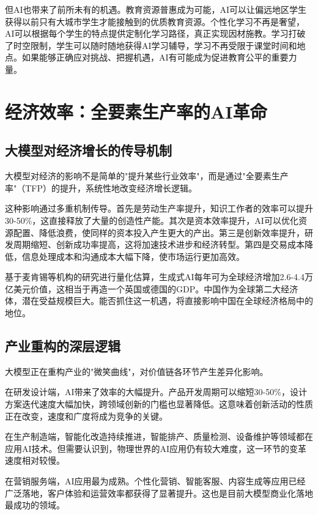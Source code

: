但AI也带来了前所未有的机遇。教育资源普惠成为可能，AI可以让偏远地区学生获得以前只有大城市学生才能接触到的优质教育资源。个性化学习不再是奢望，AI可以根据每个学生的特点提供定制化学习路径，真正实现因材施教。学习打破了时空限制，学生可以随时随地获得AI学习辅导，学习不再受限于课堂时间和地点。如果能够正确应对挑战、把握机遇，AI有可能成为促进教育公平的重要力量。

\section{经济效率：全要素生产率的AI革命}

\subsection{大模型对经济增长的传导机制}

大模型对经济的影响不是简单的"提升某些行业效率"，而是通过"全要素生产率"（TFP）的提升，系统性地改变经济增长逻辑。

这种影响通过多重机制传导。首先是劳动生产率提升，知识工作者的效率可以提升30-50\%，这直接释放了大量的创造性产能。其次是资本效率提升，AI可以优化资源配置、降低浪费，使同样的资本投入产生更大的产出。第三是创新效率提升，研发周期缩短、创新成功率提高，这将加速技术进步和经济转型。第四是交易成本降低，信息处理成本和沟通成本大幅下降，使市场运行更加高效。

基于麦肯锡等机构的研究进行量化估算，生成式AI每年可为全球经济增加2.6-4.4万亿美元价值，这相当于再造一个英国或德国的GDP。中国作为全球第二大经济体，潜在受益规模巨大。能否抓住这一机遇，将直接影响中国在全球经济格局中的地位。

\subsection{产业重构的深层逻辑}

大模型正在重构产业的"微笑曲线"，对价值链各环节产生差异化影响。

在研发设计端，AI带来了效率的大幅提升。产品开发周期可以缩短30-50\%，设计方案迭代速度大幅加快，跨领域创新的门槛也显著降低。这意味着创新活动的性质正在改变，速度和广度将成为竞争的关键。

在生产制造端，智能化改造持续推进，智能排产、质量检测、设备维护等领域都在应用AI技术。但需要认识到，物理世界的AI应用仍有较大难度，这一环节的变革速度相对较慢。

在营销服务端，AI应用最为成熟。个性化营销、智能客服、内容生成等应用已经广泛落地，客户体验和运营效率都获得了显著提升。这也是目前大模型商业化落地最成功的领域。

